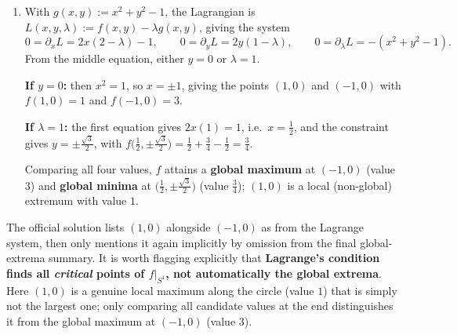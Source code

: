 \begin{exercisesolution}
\label{sol:extrema_circle_disk}
\begin{enumerate}[label=\textbf{(\alph*)}]
  \item With $g(x,y) := x^2+y^2-1$, the Lagrangian is $L(x,y,\lambda) := f(x,y) - \lambda g(x,y)$,
    giving the system
    \[0 = \partial_x L = 2x(2-\lambda) - 1, \qquad 0 = \partial_y L = 2y(1-\lambda), \qquad 0 = \partial_\lambda L = -(x^2+y^2-1).\]
    From the middle equation, either $y = 0$ or $\lambda = 1$.

    \textbf{If $y = 0$:} then $x^2 = 1$, so $x = \pm 1$, giving the points $(1,0)$ and $(-1,0)$
    with $f(1,0) = 1$ and $f(-1,0) = 3$.

    \textbf{If $\lambda = 1$:} the first equation gives $2x(1) = 1$, i.e.\ $x = \tfrac12$, and the
    constraint gives $y = \pm\tfrac{\sqrt3}{2}$, with $f\big(\tfrac12,\pm\tfrac{\sqrt3}{2}\big) =
    \tfrac12 + \tfrac34 - \tfrac12 = \tfrac34$.

    Comparing all four values, $f$ attains a \textbf{global maximum} at $(-1,0)$ (value $3$) and
    \textbf{global minima} at $\big(\tfrac12,\pm\tfrac{\sqrt3}{2}\big)$ (value $\tfrac34$); $(1,0)$
    is a local (non-global) extremum with value $1$.
  \end{enumerate}
\end{exercisesolution}

\begin{ainote}
The official solution lists $(1,0)$ alongside $(-1,0)$ as  from the Lagrange
system, then only mentions it again implicitly by omission from the final global-extrema summary.
It is worth flagging explicitly that \textbf{Lagrange's condition finds all \emph{critical} points
of $f|_{S^1}$, not automatically the global extrema}. Here $(1,0)$ is a genuine local maximum along
the circle (value $1$) that is simply not the largest one; only comparing all candidate values
at the end distinguishes it from the global maximum at $(-1,0)$ (value $3$).
\end{ainote}

